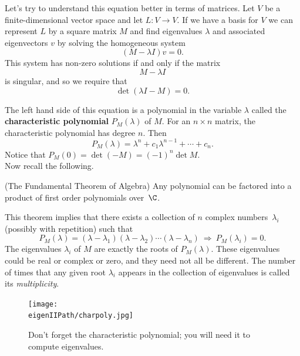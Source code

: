 Let's try to understand this equation better in terms of matrices.
Let $V$ be a finite-dimensional vector space and let $L \colon V\rightarrow V$.  
If we have a basis for $V$ we can represent $L$ by a square matrix $M$ and find eigenvalues $\lambda$ and associated eigenvectors $v$ by solving the homogeneous system
\[
(M-\lambda I)v=0.
\]
This system has non-zero solutions if and only if the matrix
\[
M-\lambda I
\]
is singular, and so we require that
\[
\det (\lambda I-M) = 0.
\]

The left hand side of this equation is a polynomial in the variable $\lambda$ called the {\bfseries characteristic polynomial} $P_M(\lambda)$ of $M$.  For an $n\times n$ matrix, the characteristic polynomial has degree $n$.  Then 
\[
P_M(\lambda) = \lambda^n+c_1\lambda^{n-1}+\cdots+c_n.
\]
Notice that $P_M(0)=\det (-M)=(-1)^n\det M$.\\

Now recall the following.
\begin{theorem} (The {Fundamental Theorem of Algebra}) 
Any polynomial can be factored into a product of first order polynomials over~$\C$.  
\end{theorem}
This theorem implies that there exists a collection of $n$ complex numbers~$\lambda_i$ (possibly with repetition) such that
\[
P_M(\lambda)=(\lambda-\lambda_1)(\lambda-\lambda_2)\cdots(\lambda-\lambda_n)\: \Longrightarrow\: P_M(\lambda_i)=0.
\]
The eigenvalues $\lambda_i$ of $M$ are exactly the roots of $P_M(\lambda)$.  These eigenvalues could be real or complex or zero, and they need not all be different.  The number of times that any given root $\lambda_i$ appears in the collection of eigenvalues is called its \emph{multiplicity}.

\begin{figure}
\begin{center}
\texttt{[image: \\eigenIIPath/charpoly.jpg]}
\end{center}
\caption{Don't forget the characteristic polynomial; you will need it to compute eigenvalues.}
\end{figure}



